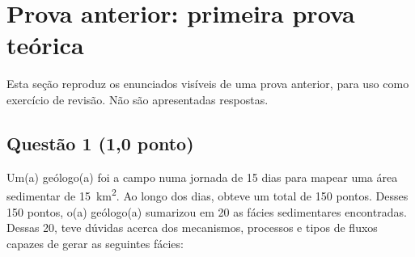 \section{Prova anterior: primeira prova teórica}

Esta seção reproduz os enunciados visíveis de uma prova anterior, para uso como
exercício de revisão. Não são apresentadas respostas.

\subsection{Questão 1 (1,0 ponto)}

Um(a) geólogo(a) foi a campo numa jornada de 15 dias para mapear uma área
sedimentar de \SI{15}{\kilo\metre\squared}. Ao longo dos dias, obteve um total de
150 pontos. Desses 150 pontos, o(a) geólogo(a) sumarizou em 20 as fácies
sedimentares encontradas. Dessas 20, teve dúvidas acerca dos mecanismos,
processos e tipos de fluxos capazes de gerar as seguintes fácies:

